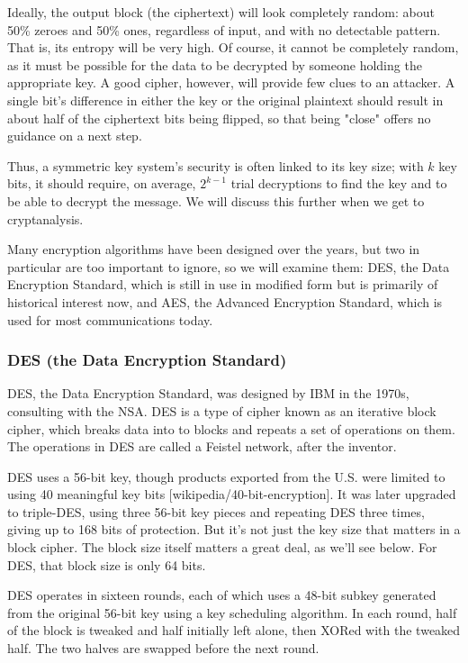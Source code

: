 \documentclass[%
 aip,
 jmp,%
 amsmath,amssymb,
 reprint,%
]{revtex4-1}
\begin{document}
Ideally, the output block (the ciphertext) will look completely
random: about 50\% zeroes and 50\% ones, regardless of input, and with
no detectable pattern.  That is, its entropy will be very high.  Of
course, it cannot be completely random, as it must be possible for the
data to be decrypted by someone holding the appropriate key.  A good
cipher, however, will provide few clues to an attacker.  A single
bit's difference in either the key or the original plaintext should
result in about half of the ciphertext bits being flipped, so that
being "close" offers no guidance on a next step.

Thus, a symmetric key system's security is often linked to its key
size; with $k$ key bits, it should require, on average, $2^{k-1}$
trial decryptions to find the key and to be able to decrypt the
message.  We will discuss this further when we get to cryptanalysis.

Many encryption algorithms have been designed over the years, but two
in particular are too important to ignore, so we will examine them:
DES, the Data Encryption Standard, which is still in use in modified
form but is primarily of historical interest now, and AES, the
Advanced Encryption Standard, which is used for most communications
today.

\subsubsection{DES (the Data Encryption Standard)}

DES, the Data Encryption Standard, was designed by IBM in the 1970s,
consulting with the NSA.  DES is a type of cipher known as an
iterative block cipher, which breaks data into to blocks and repeats a
set of operations on them.  The operations in DES are called a Feistel
network, after the inventor.

DES uses a 56-bit key, though products exported from the U.S. were
limited to using 40 meaningful key bits [wikipedia/40-bit-encryption].
It was later upgraded to triple-DES, using three 56-bit key pieces and
repeating DES three times, giving up to 168 bits of protection.  But
it's not just the key size that matters in a block cipher.  The block
size itself matters a great deal, as we'll see below.  For DES, that
block size is only 64 bits.

DES operates in sixteen rounds, each of which uses a 48-bit subkey
generated from the original 56-bit key using a key scheduling
algorithm.  In each round, half of the block is tweaked and half
initially left alone, then XORed with the tweaked half.  The two
halves are swapped before the next round.
\end{document}

